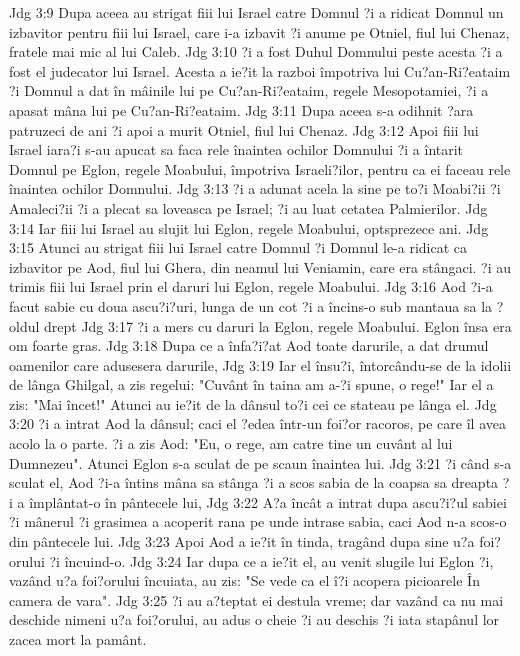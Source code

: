Jdg 3:9  Dupa aceea au strigat fiii lui Israel catre Domnul ?i a ridicat Domnul un izbavitor pentru fiii lui Israel, care i-a izbavit ?i anume pe Otniel, fiul lui Chenaz, fratele mai mic al lui Caleb.
Jdg 3:10  ?i a fost Duhul Domnului peste acesta ?i a fost el judecator lui Israel. Acesta a ie?it la razboi împotriva lui Cu?an-Ri?eataim ?i Domnul a dat în mâinile lui pe Cu?an-Ri?eataim, regele Mesopotamiei, ?i a apasat mâna lui pe Cu?an-Ri?eataim.
Jdg 3:11  Dupa aceea s-a odihnit ?ara patruzeci de ani ?i apoi a murit Otniel, fiul lui Chenaz.
Jdg 3:12  Apoi fiii lui Israel iara?i s-au apucat sa faca rele înaintea ochilor Domnului ?i a întarit Domnul pe Eglon, regele Moabului, împotriva Israeli?ilor, pentru ca ei faceau rele înaintea ochilor Domnului.
Jdg 3:13  ?i a adunat acela la sine pe to?i Moabi?ii ?i Amaleci?ii ?i a plecat sa loveasca pe Israel; ?i au luat cetatea Palmierilor.
Jdg 3:14  Iar fiii lui Israel au slujit lui Eglon, regele Moabului, optsprezece ani.
Jdg 3:15  Atunci au strigat fiii lui Israel catre Domnul ?i Domnul le-a ridicat ca izbavitor pe Aod, fiul lui Ghera, din neamul lui Veniamin, care era stângaci. ?i au trimis fiii lui Israel prin el daruri lui Eglon, regele Moabului.
Jdg 3:16  Aod ?i-a facut sabie cu doua ascu?i?uri, lunga de un cot ?i a încins-o sub mantaua sa la ?oldul drept
Jdg 3:17  ?i a mers cu daruri la Eglon, regele Moabului. Eglon însa era om foarte gras.
Jdg 3:18  Dupa ce a înfa?i?at Aod toate darurile, a dat drumul oamenilor care adusesera darurile,
Jdg 3:19  Iar el însu?i, întorcându-se de la idolii de lânga Ghilgal, a zis regelui: "Cuvânt în taina am a-?i spune, o rege!" Iar el a zis: "Mai încet!" Atunci au ie?it de la dânsul to?i cei ce stateau pe lânga el.
Jdg 3:20  ?i a intrat Aod la dânsul; caci el ?edea într-un foi?or racoros, pe care îl avea acolo la o parte. ?i a zis Aod: "Eu, o rege, am catre tine un cuvânt al lui Dumnezeu". Atunci Eglon s-a sculat de pe scaun înaintea lui.
Jdg 3:21  ?i când s-a sculat el, Aod ?i-a întins mâna sa stânga ?i a scos sabia de la coapsa sa dreapta ?i a împlântat-o în pântecele lui,
Jdg 3:22  A?a încât a intrat dupa ascu?i?ul sabiei ?i mânerul ?i grasimea a acoperit rana pe unde intrase sabia, caci Aod n-a scos-o din pântecele lui.
Jdg 3:23  Apoi Aod a ie?it în tinda, tragând dupa sine u?a foi?orului ?i încuind-o.
Jdg 3:24  Iar dupa ce a ie?it el, au venit slugile lui Eglon ?i, vazând u?a foi?orului încuiata, au zis: "Se vede ca el î?i acopera picioarele În camera de vara".
Jdg 3:25  ?i au a?teptat ei destula vreme; dar vazând ca nu mai deschide nimeni u?a foi?orului, au adus o cheie ?i au deschis ?i iata stapânul lor zacea mort la pamânt.
